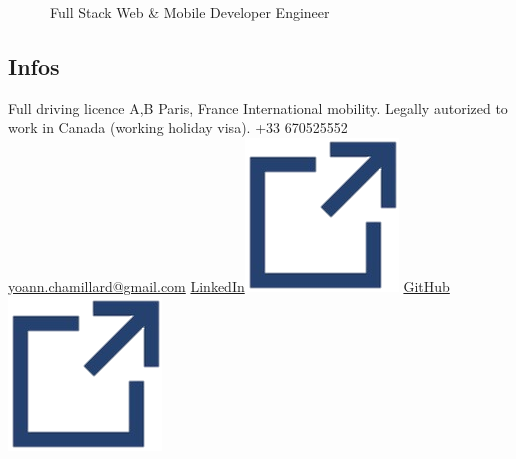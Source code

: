 \documentclass[]{friggeri-cv}
\begin{document}
      {~~~~~~Full Stack Web \& Mobile Developer Engineer}
      {}

\begin{aside}
\vspace{21mm}\section{Infos}
Full driving licence A,B\vspace{2.5mm}
Paris, France\vspace{1.5mm}
International mobility. Legally autorized to work in Canada (working holiday visa).\vspace{2.5mm}
+33 670525552
\href{mailto:yoann.chamillard@gmail.com}{\small yoann.chamillard@gmail.com}\vspace{2.5mm}
\href{https://www.linkedin.com/in/yoannchamillard/?locale=en_US}{LinkedIn\hspace{1.5mm}\includegraphics[scale=0.075]{res/img/hlink.png}}
\href{https://github.com/Nokheenig?tab=stars}{GitHub\hspace{1.5mm}\includegraphics[scale=0.075]{res/img/hlink.png}}\vspace{2.5mm}
\vspace{2.5mm}

\end{aside}
\end{document}
